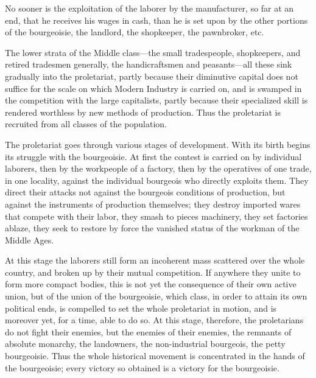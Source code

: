 No sooner is the exploitation of the laborer by the manufacturer, so far at an end, that he receives his wages in cash, than he is set upon by the other portions of the bourgeoisie, the landlord, the shopkeeper, the pawnbroker, etc.

The lower strata of the Middle class—the small tradespeople, shopkeepers, and retired tradesmen generally, the handicraftsmen and peasants—all these sink gradually into the proletariat, partly because their diminutive capital does not suffice for the scale on which Modern Industry is carried on, and is swamped in the competition with the large capitalists, partly because their specialized skill is rendered worthless by new methods of production. Thus the proletariat is recruited from all classes of the population.

The proletariat goes through various stages of development. With its birth begins its struggle with the bourgeoisie. At first the contest is carried on by individual laborers, then by the workpeople of a factory, then by the operatives of one trade, in one locality, against the individual bourgeois who directly exploits them. They direct their attacks not against the bourgeois conditions of production, but against the instruments of production themselves; they destroy imported wares that compete with their labor, they smash to pieces machinery, they set factories ablaze, they seek to restore by force the vanished status of the workman of the Middle Ages.

At this stage the laborers still form an incoherent mass scattered over the whole country, and broken up by their mutual competition. If anywhere they unite to form more compact bodies, this is not yet the consequence of their own active union, but of the union of the bourgeoisie, which class, in order to attain its own political ends, is compelled to set the whole proletariat in motion, and is moreover yet, for a time, able to do so. At this stage, therefore, the proletarians do not fight their enemies, but the enemies of their enemies, the remnants of absolute monarchy, the landowners, the non-industrial bourgeois, the petty bourgeoisie. Thus the whole historical movement is concentrated in the hands of the bourgeoisie; every victory so obtained is a victory for the bourgeoisie.

